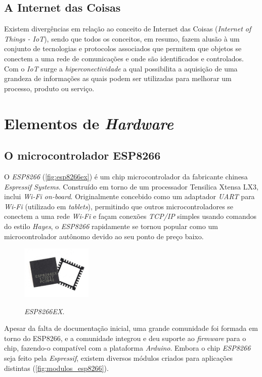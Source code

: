 \subsection{A Internet das Coisas}

Existem divergências em relação ao conceito de Internet das Coisas (\textit{Internet of Things - IoT}), sendo que todos os conceitos, em resumo, fazem alusão à um conjunto de tecnologias e protocolos associados que permitem que objetos se conectem a uma rede de comunicações e onde são identificados e controlados.
Com o \textit{IoT} surge a \textit{hiperconectividade} a qual possibilita a aquisição de uma grandeza de informações as quais podem ser utilizadas para melhorar um processo, produto ou serviço.


\section{Elementos de \textit{Hardware}}
\subsection{O microcontrolador ESP8266}

O \textit{ESP8266} (\autoref{fig:esp8266ex}) é um chip microcontrolador da fabricante chinesa \textit{Espressif Systems}. Construído em torno de um processador Tensilica Xtensa LX3, inclui \textit{Wi-Fi on-board}. Originalmente concebido como um adaptador \textit{UART} para \textit{Wi-Fi} (utilizado em \textit{tablets}), permitindo que outros microcontroladores se conectem a uma rede \textit{Wi-Fi} e façam conexões \textit{TCP/IP} simples usando comandos do estilo \textit{Hayes}, o \textit{ESP8266} rapidamente se tornou popular como um microcontrolador autônomo devido ao seu ponto de preço baixo.

\begin{figure}[H]
	\centering
	\caption{\textit{ESP8266EX}.}
	\includegraphics[width=0.3\textwidth]{figuras/esp8266ex.jpg}
	\label{fig:esp8266ex}
\end{figure} 

Apesar da falta de documentação inicial, uma grande comunidade foi formada em
torno do ESP8266, e a comunidade integrou e deu suporte ao \textit{firmware} para o chip, fazendo-o compatível com a plataforma \textit{Arduino}.
Embora o chip \textit{ESP8266} seja feito pela \textit{Espressif}, existem diversos módulos criados para aplicações distintas (\autoref{fig:modulos_esp8266}).

